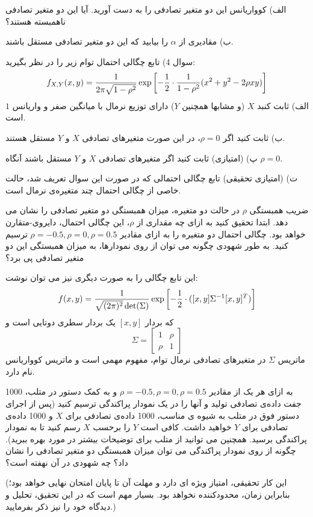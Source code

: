 \documentclass[10pt,letterpaper]{article}
\begin{document}
الف) کوواریانس این دو متغیر تصادفی را به دست آورید. آیا این دو متغیر تصادفی ناهمبسته هستند؟

ب) مقادیری از $\alpha$ را بیابید که این دو متغیر تصادفی مستقل باشند.

سوال 4) تابع چگالی احتمال توام زیر را در نظر بگیرید:
$$
f_{X,Y}(x,y)={1\over 2\pi \sqrt{1-\rho^2}}\exp\left[-{1\over 2}\cdot{1\over 1-\rho^2}(x^2+y^2-2\rho xy)\right]
$$
الف) ثابت کنبد $X$ (و مشابها همچنین $Y$) دارای توزیع نرمال با میانگین صفر و واریانس $1$ است.

ب) ثابت کنید اگر $\rho=0$، در این صورت متغیرهای تصادفی $X$ و $Y$ مستقل هستند.

پ) (امتیازی) ثابت کنید اگر متغیرهای تصادفی $X$ و $Y$ مستقل باشند آنگاه $\rho=0$.

ت) (امتیازی تحقیقی) تابع چگالی احتمالی که در صورت این سوال تعریف شد، حالت خاصی از چگالی احتمال چند متغیره‌ی نرمال است.

ضریب همبستگی $\rho$ در حالت دو متغیره، میزان همبستگی دو متغیر تصادفی را نشان می دهد. ابتدا تحقیق کنید به ازای چه مقداری از $\rho$، این چگالی احتمال، دایروی-متقارن خواهد بود. چگالی احتمال دو متغیره را به ازای مقادیر 
$
\rho=-0.5,\rho=0,\rho=0.5
$
 ترسیم کنید. به طور شهودی چگونه می توان از روی نمودارها، به میزان همبستگی این دو متغیر تصادفی پی برد؟

این تابع چگالی را به صورت دیگری نیز می توان نوشت:
$$
f(x,y)={1\over \sqrt{(2\pi)^2}\det(\Sigma)}\exp\left[-{1\over 2}\cdot([x,y]\Sigma^{-1}[x,y]^T)\right]
$$
که بردار $[x,y]$ یک بردار سطری دوتایی است و 
$$
\Sigma=\begin{bmatrix}
1&\rho\\
\rho&1
\end{bmatrix}
$$
ماتریس $\Sigma$ در متغیرهای تصادفی نرمال توام، مفهوم مهمی است و ماتریس کوواریانس نام دارد.

به ازای هر یک از مقادیر 
$
\rho=-0.5,\rho=0,\rho=0.5
$
 و به کمک دستور 
 در متلب، 1000 جفت داده‌ی تصادفی تولید و آنها را در یک نمودار پراکندگی ترسیم کنید (پس از اجرای دستور فوق در متلب به شیوه ی مناسب، 1000 داده‌ی تصادفی برای $X$ و 1000 داده‌ی تصادفی برای $Y$ خواهید داشت. کافی است $Y$ را برحسب $X$ رسم کنید تا به نمودار پراکندگی برسید. همچنین می توانید از  متلب برای توضیحات بیشتر در مورد  بهره ببرید). چگونه از روی نمودار پراکندگی می توان میزان همبستگی دو متغیر تصادفی را نشان داد؟ چه شهودی در آن نهفته است؟

(این کار تحقیقی، امتیاز ویژه ای دارد و مهلت آن تا پایان امتحان نهایی خواهد بود؛ بنابراین زمان، محدودکننده نخواهد بود. بسیار مهم است که در این تحقیق، تحلیل و دیدگاه خود را نیز ذکر بفرمایید.)
\end{document}
